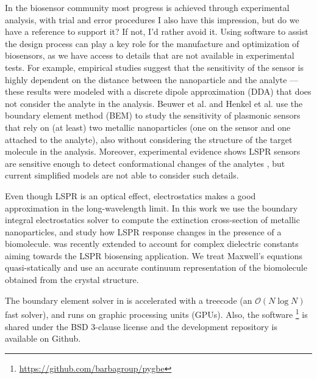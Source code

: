 In the biosensor community most progress is achieved 
through experimental analysis, with trial and error procedures {\color{blue} I also have this impression, but do we have a reference to support it? If not, I'd rather avoid it}. 
Using software to assist the design process can play a key role for the manufacture and optimization
of biosensors, as we have access to details that are not available in experimental tests.
For example, empirical studies suggest that the sensitivity of the sensor
is highly dependent on the distance between the nanoparticle and the analyte \cite{HaesETal2004} ---
these results were modeled with a discrete dipole approximation (DDA) that does not consider the analyte in the analysis. 
Beuwer et al. \cite{BeuwervanHoofZijlstra2018} and Henkel et al. \cite{HenkelETal2018} use the boundary element method (BEM) to study the sensitivity of plasmonic sensors that rely on (at least) two metallic nanoparticles (one on the sensor and one attached to the analyte), also without considering the structure of the target molecule in the analysis.
Moreover, experimental evidence shows LSPR sensors are sensitive enough to detect conformational changes of the analytes \cite{HallETal2011}, 
but current simplified models are not able to consider such details.


Even though LSPR is an optical effect, electrostatics 
makes a good approximation in the long-wavelength limit. In this work we use
the boundary integral electrostatics solver \pygbe \cite{CooperETal2016} 
to compute the extinction cross-section of metallic nanoparticles, and study how LSPR 
response changes in the presence
of a biomolecule. \pygbe was recently extended to account for complex dielectric constants 
\cite{ClementiETal2017} aiming towards the LSPR biosensing application. We treat Maxwell's
equations quasi-statically \cite{MayergoyzZhang2007} and
use an accurate continuum representation of the biomolecule obtained from the
crystal structure. 

The boundary element solver in \pygbe
is accelerated with a treecode (an $\mathcal{O}(N\log N)$ fast solver), and runs on
graphic processing units (GPUs). Also, the software
\footnote{\url{https://github.com/barbagroup/pygbe}} is shared under the 
BSD 3-clause license and the development repository is available on Github.




